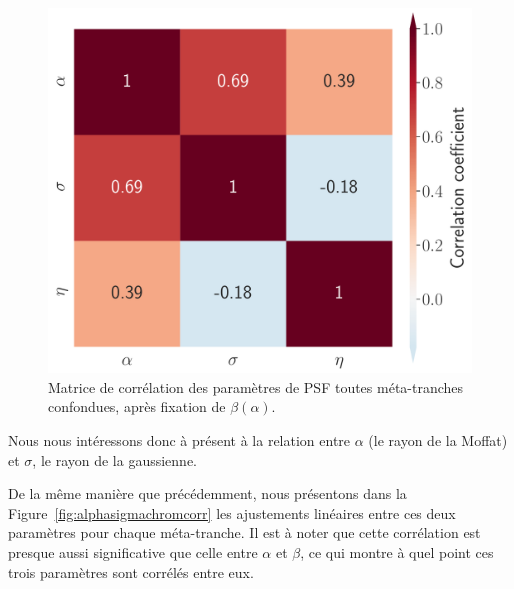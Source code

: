 \documentclass[../main/main.tex]{subfiles}
\begin{document}
\begin{figure}[ht]
  \begin{minipage}[c]{0.4\textwidth}
    \includegraphics[width=\textwidth]{../figures/06_irf/STD_correlation_matrix_betafixed.pdf}
  \end{minipage}\hfill
  \begin{minipage}[c]{0.53\textwidth}
    \caption[Matrice de corrélation des paramètres de PSF ($\beta(\alpha)$ fixé).]{Matrice de
      corrélation des paramètres de PSF toutes méta-tranches confondues,
    après fixation de $\beta(\alpha)$.}\label{fig:stdcorrmatrixbetafixed}
  \end{minipage}
\end{figure}

Nous nous intéressons donc à présent à la relation entre $\alpha$ (le
rayon de la Moffat) et $\sigma$, le rayon de la gaussienne.

De la même manière que précédemment, nous présentons dans la
Figure~\ref{fig:alphasigmachromcorr} les ajustements linéaires entre ces
deux paramètres pour chaque méta-tranche. Il est à noter que cette
corrélation est presque aussi significative que celle entre $\alpha$ et
$\beta$, ce qui montre à quel point ces trois paramètres sont corrélés
entre eux.
\end{document}
